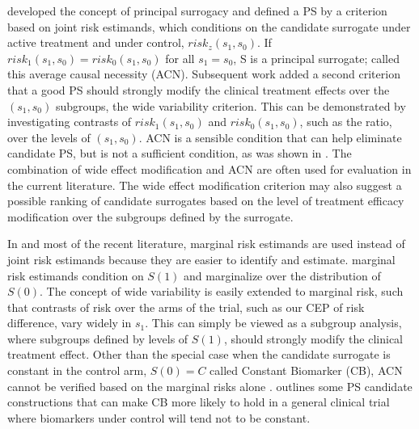 \documentclass[times, doublespace]{simauth}
\begin{document}
\citet{Frangakis02} developed the concept of principal surrogacy and defined a PS by a criterion based on joint risk estimands, which conditions on the candidate surrogate under active treatment and under control, $risk_z(s_1,s_0)$. If $risk_1(s_1,s_0)=risk_0(s_1,s_0)$ for all $s_1 = s_0$, S is a principal surrogate; \citet{Gilbert08} called this average causal necessity (ACN). Subsequent work added a second criterion that a good PS should strongly modify the clinical treatment effects over the $(s_1, s_0)$ subgroups, the wide variability criterion. This can be demonstrated by investigating contrasts of $risk_1(s_1,s_0)$ and $risk_0(s_1,s_0)$, such as the ratio, over the levels of $(s_1, s_0)$. ACN is a sensible condition that can help eliminate candidate PS, but is not a sufficient condition, as was shown in \citet{Vanderweele11}. The combination of wide effect modification and ACN are often used for evaluation in the current literature. The wide effect modification criterion may also suggest a possible ranking of candidate surrogates based on the level of treatment efficacy modification over the subgroups defined by the surrogate. 

In \citet{Gilbert08} and most of the recent literature, marginal risk estimands are used instead of joint risk estimands because they are easier to identify and estimate. marginal risk estimands condition on $S(1)$ and marginalize over the distribution of $S(0)$. The concept of wide variability is easily extended to marginal risk, such that contrasts of risk over the arms of the trial, such as our CEP of risk difference, vary widely in $s_1$. This can simply be viewed as a subgroup analysis, where subgroups defined by levels of $S(1)$, should strongly modify the clinical treatment effect. Other than the special case when the candidate surrogate is constant in the control arm, $S(0)=C$ called Constant Biomarker (CB), ACN cannot be verified based on the marginal risks alone \citep{Gilbert08, Gabriel13}. \citet{Gabriel13} outlines some PS candidate constructions that can make CB more likely to hold in a general clinical trial where biomarkers under control will tend not to be constant. 
  
\end{document}
